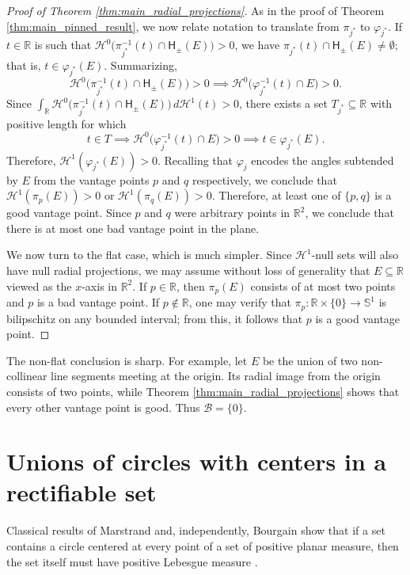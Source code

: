 \documentclass[12pt]{amsart}
\theoremstyle{definition}
\numberwithin{equation}{section}
\begin{document}
\begin{proof}[Proof of Theorem \ref{thm:main_radial_projections}]
As in the proof of Theorem \ref{thm:main_pinned_result}, we now relate notation to translate from $\pi_{j^*}$ to $\varphi_{j^*}$. If $t \in \mathbb{R}$ is such that $ \mathcal{H}^0\big(\pi_{j^*}^{-1}(t) \cap \mathsf{H}_{\pm}(E)\big) > 0$, we have $\pi_{j^*}(t) \cap \mathsf{H}_{\pm}(E) \ne \emptyset$; that is, $t \in \varphi_{j^*}(E)$. Summarizing,
$$ \mathcal{H}^0\big(\pi_{j^*}^{-1}(t) \cap \mathsf{H}_{\pm}(E)\big) > 0 \implies  \mathcal{H}^0\big(\varphi_{j^*}^{-1}(t) \cap E\big) > 0.$$
Since $\int_{\mathbb{R}} \mathcal{H}^0\big(\pi_{j^*}^{-1}(t) \cap \mathsf{H}_{\pm}(E)\big) \, d\mathcal{H}^1(t) > 0$, there exists a set $T_{j^*} \subseteq \mathbb{R}$ with positive length for which 
$$t \in T \implies \mathcal{H}^0\big(\varphi_{j^*}^{-1}(t) \cap E\big) > 0 \implies t \in \varphi_{j^*}(E).$$
Therefore, $\mathcal{H}^1(\varphi_{j^*}(E)) > 0$. Recalling that $\varphi_j$ encodes the angles subtended by $E$ from the vantage points $p$ and $q$ respectively, we conclude that $\mathcal{H}^1(\pi_p(E)) > 0$ or $\mathcal{H}^1(\pi_q(E)) > 0.$ Therefore, at least one of $\{p, q\}$ is a good vantage point. Since $p$ and $q$ were arbitrary points in $\mathbb{R}^2$, we conclude that there is at most one bad vantage point in the plane. 

We now turn to the flat case, which is much simpler. Since $\mathcal{H}^1$-null sets will also have null radial projections, we may assume without loss of generality that $E \subseteq \mathbb{R}$ viewed as the $x$-axis in $\mathbb{R}^2$. If $p \in \mathbb{R}$, then $\pi_p(E)$ consists of at most two points and $p$ is a bad vantage point. If $p \notin \mathbb{R}$, one may verify that $\pi_p : \mathbb{R} \times \{0\} \to \mathbb{S}^1$ is bilipschitz on any bounded interval; from this, it follows that $p$ is a good vantage point.
\end{proof}

The non-flat conclusion is sharp. For example, let $E$ be the union of two non-collinear line segments meeting at the origin. Its radial image from the origin consists of two points, while Theorem \ref{thm:main_radial_projections} shows that every other vantage point is good. Thus $\mathcal{B}=\{0\}$.



\section{Unions of circles with centers in a rectifiable set}\label{sec:circles}
 Classical results of Marstrand and, independently, Bourgain show that if a set contains a circle centered at every point of a set of positive planar measure, then the set itself must have positive Lebesgue measure \cite{Bourgain1986, Marstrand1987}. 
\end{document}
